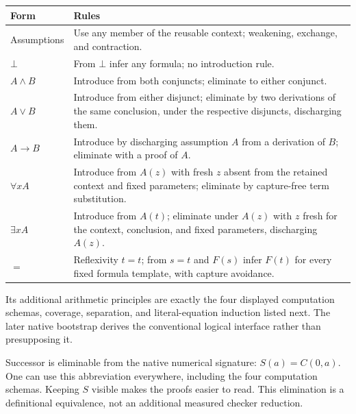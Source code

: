 \begin{center}\small
\begin{tabularx}{\linewidth}{@{}lX@{}}
\toprule
Form & Rules\\\midrule
Assumptions & Use any member of the reusable context; weakening, exchange,
and contraction.\\[3pt]
$\bot$ & From $\bot$ infer any formula; no introduction rule.\\[3pt]
$A\land B$ & Introduce from both conjuncts; eliminate to either conjunct.\\[3pt]
$A\lor B$ & Introduce from either disjunct; eliminate by two derivations of
the same conclusion, under the respective disjuncts, discharging them.\\[3pt]
$A\to B$ & Introduce by discharging assumption $A$ from a derivation of $B$;
eliminate with a proof of $A$.\\[3pt]
$\forall xA$ & Introduce from $A(z)$ with fresh $z$ absent from the retained
context and fixed parameters; eliminate by capture-free term substitution.\\[3pt]
$\exists xA$ & Introduce from $A(t)$; eliminate under $A(z)$ with $z$ fresh
for the context, conclusion, and fixed parameters, discharging $A(z)$.\\[3pt]
$=$ & Reflexivity $t=t$; from $s=t$ and $F(s)$ infer $F(t)$ for every
fixed formula template, with capture avoidance.\\
\bottomrule
\end{tabularx}
\end{center}

Its additional arithmetic principles are exactly the four displayed
computation schemas, coverage, separation, and literal-equation induction
listed next. The later native bootstrap derives the conventional logical
interface rather than presupposing it.

Successor is eliminable from the native numerical signature:
$S(a)=C(0,a)$. One can use this abbreviation everywhere, including the
four computation schemas. Keeping $S$ visible makes the proofs easier
to read. This elimination is a definitional equivalence, not an additional
measured checker reduction.
